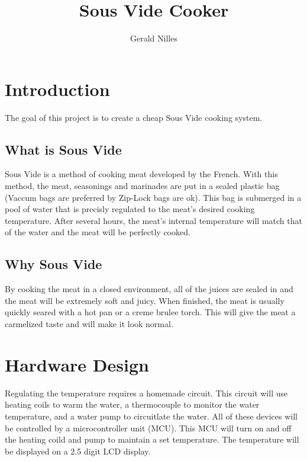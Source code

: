 \documentclass[12pt,letterpaper]{article}
\author{Gerald Nilles}
\title{Sous Vide Cooker}
\begin{document}
\maketitle

\tableofcontents

\newpage


\section{Introduction}
The goal of this project is to create a cheap Sous Vide cooking system.
\subsection{What is Sous Vide}
Sous Vide is a method of cooking meat developed by the French.
With this method, the meat, seasonings and marinades are put in a sealed plastic bag (Vaccum bags are preferred by Zip-Lock bags are ok).
This bag is submerged in a pool of water that is precisly regulated to the meat's desired cooking temperature.
After several  hours, the meat's internal temperature will match that of the water and the meat will be perfectly cooked.\\

\subsection{Why Sous Vide}
By cooking the meat in a closed environment, all of the juices are sealed in and the meat will be extremely soft and juicy.
When finished, the meat is usually quickly seared with a hot pan or a creme brulee torch.
This will give the meat a carmelized taste and will make it look normal.


\section{Hardware Design}
Regulating the temperature requires a homemade circuit.
This circuit will use heating coils to warm the water, a thermocouple to monitor the water temperature, and a water pump to circuitlate the water.
All of these devices will be controlled by a microcontroller unit (MCU).
This MCU will turn on and off the heating coild and pump to maintain a set temperature.
The temperature will be displayed on a 2.5 digit LCD display.
\end{document}
